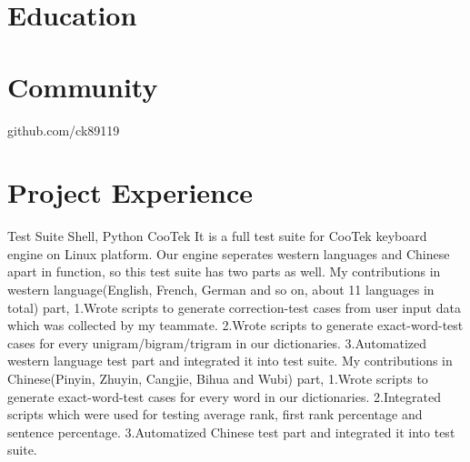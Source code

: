 \documentclass[11pt,a4paper]{moderncv}
\begin{document}
\maketitle

\section{Education}


\section{Community}
{github.com/ck89119}{}{}{}{}

\section{Project Experience}
{Test Suite}
{Shell, Python}{}
{CooTek}
{
It is a full test suite for CooTek keyboard engine on Linux platform.
Our engine seperates western languages and Chinese apart in function, so this test suite has two parts as well.
\newline My contributions in western language(English, French, German and so on, about 11 languages in total) part,
\newline 1.Wrote scripts to generate correction-test cases from user input data which was collected by my teammate.
\newline 2.Wrote scripts to generate exact-word-test cases for every unigram/bigram/trigram in our dictionaries.
\newline 3.Automatized western language test part and integrated it into test suite.
\newline My contributions in Chinese(Pinyin, Zhuyin, Cangjie, Bihua and Wubi) part,
\newline 1.Wrote scripts to generate exact-word-test cases for every word in our dictionaries.
\newline 2.Integrated scripts which were used for testing average rank, first rank percentage and sentence percentage.
\newline 3.Automatized Chinese test part and integrated it into test suite.
\newline
}
\end{document}
